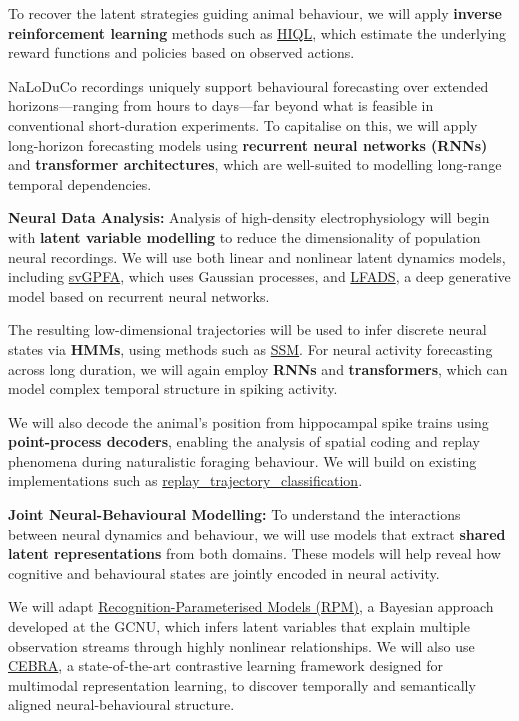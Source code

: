 To recover the latent strategies guiding animal behaviour, we will apply
\textbf{inverse reinforcement learning} methods such as
\href{https://github.com/haozhu10015/hiql}{HIQL}, which estimate the underlying
reward functions and policies based on observed actions.

NaLoDuCo recordings uniquely support behavioural forecasting over extended
horizons—ranging from hours to days—far beyond what is feasible in conventional
short-duration experiments. To capitalise on this, we will apply
long-horizon forecasting models using \textbf{recurrent neural networks (RNNs)}
and \textbf{transformer architectures}, which are well-suited to modelling
long-range temporal dependencies.

\vspace{1em}
\noindent\textbf{Neural Data Analysis:}  
Analysis of high-density electrophysiology will begin with \textbf{latent
variable modelling} to reduce the dimensionality of population neural
recordings. We will use both linear and nonlinear latent dynamics models,
including \href{https://github.com/joacorapela/svGPFA}{svGPFA}, which uses
Gaussian processes, and \href{https://snel.ai/resources/lfads/}{LFADS}, a deep
generative model based on recurrent neural networks.

The resulting low-dimensional trajectories will be used to infer discrete
neural states via \textbf{HMMs}, using methods such as
\href{https://github.com/lindermanlab/ssm}{SSM}. For neural activity
forecasting across long duration, we will again employ \textbf{RNNs} and
\textbf{transformers}, which can model complex temporal structure in spiking
activity.

We will also decode the animal’s position from hippocampal spike trains using
\textbf{point-process decoders}, enabling the analysis of spatial coding and
replay phenomena during naturalistic foraging behaviour. We will build on
existing implementations such as
\href{https://github.com/Eden-Kramer-Lab/replay_trajectory_classification}{replay\_trajectory\_classification}.

\vspace{1em}
\noindent\textbf{Joint Neural-Behavioural Modelling:}  
To understand the interactions between neural dynamics and behaviour, we will
use models that extract \textbf{shared latent representations} from both
domains. These models will help reveal how cognitive and behavioural states are
jointly encoded in neural activity.

We will adapt
\href{https://github.com/gatsby-sahani/rpm-aistats-2023}{Recognition-Parameterised
Models (RPM)}, a Bayesian approach developed at the GCNU, which infers latent
variables that explain multiple observation streams through highly nonlinear
relationships. We will also use \href{https://cebra.ai/}{CEBRA}, a
state-of-the-art contrastive learning framework designed for multimodal
representation learning, to discover temporally and semantically aligned
neural-behavioural structure.

